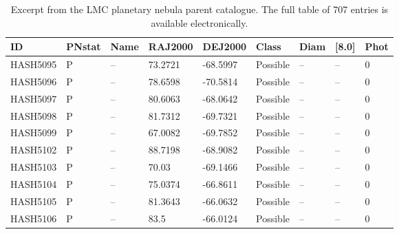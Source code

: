 \begin{table}
\centering
\caption{Excerpt from the LMC planetary nebula parent catalogue. The full table of 707 entries is available electronically.}
\label{tab:parent_catalogue}
\begin{tabular}{lllllllll}
\hline
ID & PNstat & Name & RAJ2000 & DEJ2000 & Class & Diam & [8.0] & Phot \\
\hline
HASH5095 & P & -- & 73.2721 & -68.5997 & Possible & -- & -- & 0 \\
HASH5096 & P & -- & 78.6598 & -70.5814 & Possible & -- & -- & 0 \\
HASH5097 & P & -- & 80.6063 & -68.0642 & Possible & -- & -- & 0 \\
HASH5098 & P & -- & 81.7312 & -69.7321 & Possible & -- & -- & 0 \\
HASH5099 & P & -- & 67.0082 & -69.7852 & Possible & -- & -- & 0 \\
HASH5102 & P & -- & 88.7198 & -68.9082 & Possible & -- & -- & 0 \\
HASH5103 & P & -- & 70.03 & -69.1466 & Possible & -- & -- & 0 \\
HASH5104 & P & -- & 75.0374 & -66.8611 & Possible & -- & -- & 0 \\
HASH5105 & P & -- & 81.3643 & -66.0632 & Possible & -- & -- & 0 \\
HASH5106 & P & -- & 83.5 & -66.0124 & Possible & -- & -- & 0 \\
\hline
\end{tabular}
\end{table}

